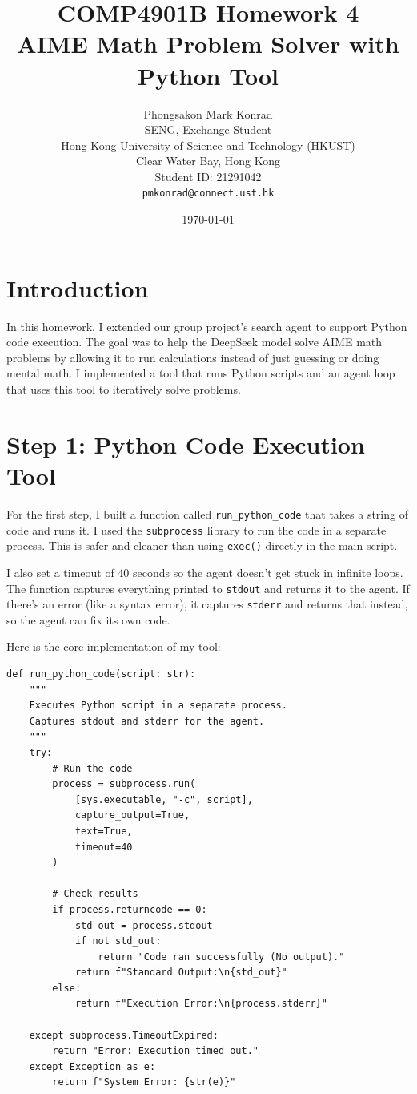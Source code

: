 \documentclass{article}
\title{COMP4901B Homework 4 \\ AIME Math Problem Solver with Python Tool}
\author{
  Phongsakon Mark Konrad \\
  SENG, Exchange Student \\
  Hong Kong University of Science and Technology (HKUST) \\
  Clear Water Bay, Hong Kong \\
  Student ID: 21291042 \\
  \texttt{pmkonrad@connect.ust.hk}
}
\date{\today}
\begin{document}
\maketitle

\section{Introduction}
In this homework, I extended our group project's search agent to support Python code execution. The goal was to help the DeepSeek model solve AIME math problems by allowing it to run calculations instead of just guessing or doing mental math. I implemented a tool that runs Python scripts and an agent loop that uses this tool to iteratively solve problems.

\section{Step 1: Python Code Execution Tool}

For the first step, I built a function called \texttt{run\_python\_code} that takes a string of code and runs it. I used the \texttt{subprocess} library to run the code in a separate process. This is safer and cleaner than using \texttt{exec()} directly in the main script. 

I also set a timeout of 40 seconds so the agent doesn't get stuck in infinite loops. The function captures everything printed to \texttt{stdout} and returns it to the agent. If there's an error (like a syntax error), it captures \texttt{stderr} and returns that instead, so the agent can fix its own code.

Here is the core implementation of my tool:

\begin{lstlisting}[caption={Implementation of the Python execution tool}]
def run_python_code(script: str):
    """
    Executes Python script in a separate process.
    Captures stdout and stderr for the agent.
    """
    try:
        # Run the code
        process = subprocess.run(
            [sys.executable, "-c", script], 
            capture_output=True, 
            text=True, 
            timeout=40 
        )
        
        # Check results
        if process.returncode == 0:
            std_out = process.stdout
            if not std_out:
                return "Code ran successfully (No output)."
            return f"Standard Output:\n{std_out}"
        else:
            return f"Execution Error:\n{process.stderr}"

    except subprocess.TimeoutExpired:
        return "Error: Execution timed out."
    except Exception as e:
        return f"System Error: {str(e)}"
\end{lstlisting}
\end{document}
